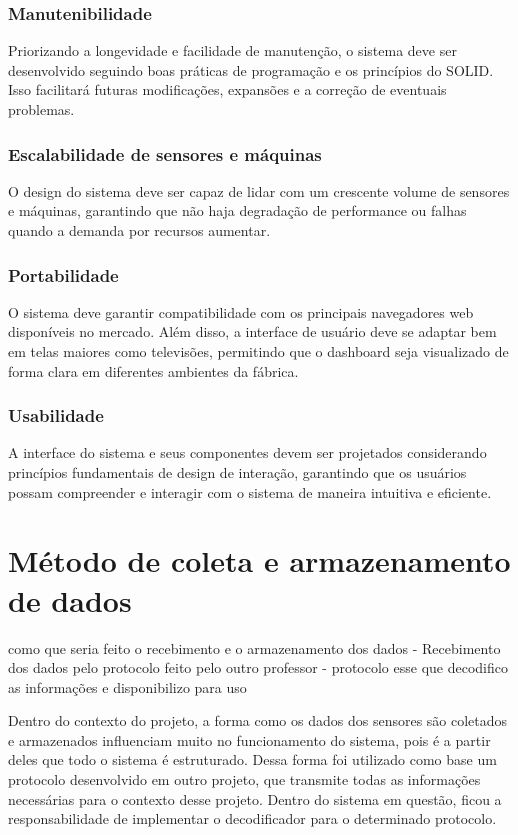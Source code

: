 \subsubsection{Manutenibilidade}
Priorizando a longevidade e facilidade de manutenção, o sistema deve ser desenvolvido seguindo boas práticas de programação e os princípios do SOLID. Isso facilitará futuras modificações, expansões e a correção de eventuais problemas.

\subsubsection{Escalabilidade de sensores e máquinas}
O design do sistema deve ser capaz de lidar com um crescente volume de sensores e máquinas, garantindo que não haja degradação de performance ou falhas quando a demanda por recursos aumentar.

\subsubsection{Portabilidade}
O sistema deve garantir compatibilidade com os principais navegadores web disponíveis no mercado. Além disso, a interface de usuário deve se adaptar bem em telas maiores como televisões, permitindo que o dashboard seja visualizado de forma clara em diferentes ambientes da fábrica.

\subsubsection{Usabilidade}
A interface do sistema e seus componentes devem ser projetados considerando princípios fundamentais de design de interação, garantindo que os usuários possam compreender e interagir com o sistema de maneira intuitiva e eficiente.


\section[Método de coleta e armazenamento de dados]{Método de coleta e armazenamento de dados}
como que seria feito o recebimento e o armazenamento dos dados
- Recebimento dos dados pelo protocolo feito pelo outro professor
- protocolo esse que decodifico as informações e disponibilizo para uso

Dentro do contexto do projeto, a forma como os dados dos sensores são coletados e armazenados influenciam muito no funcionamento do sistema, pois é a partir deles que todo o sistema é estruturado. Dessa forma foi utilizado como base um protocolo desenvolvido em outro projeto, que transmite todas as informações necessárias para o contexto desse projeto. Dentro do sistema em questão, ficou a responsabilidade de implementar o decodificador para o determinado protocolo.

